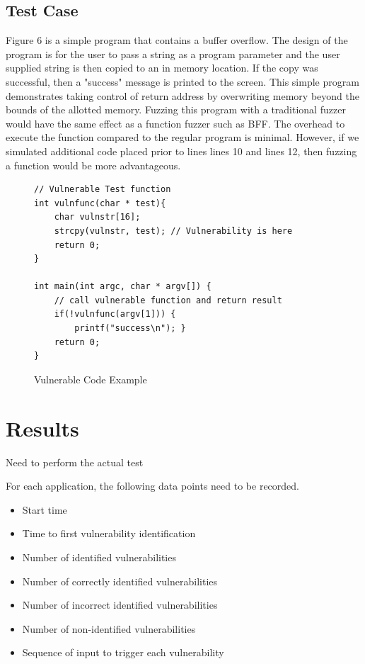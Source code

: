 \documentclass[conference]{IEEEtran}
\begin{document}
\subsection{Test Case}
Figure 6 is a simple program that contains a buffer overflow. The design of the program is for the user to pass a string as a program parameter and the user supplied string is then copied to an in memory location. If the copy was successful, then a "success" message is printed to the screen. This simple program demonstrates taking control of return address by overwriting memory beyond the bounds of the allotted memory. Fuzzing this program with a traditional fuzzer would have the same effect as a function fuzzer such as BFF. The overhead to execute the function compared to the regular program is minimal. However, if we simulated additional code placed prior to lines lines 10 and lines 12, then fuzzing a function would be more advantageous.  

\begin{figure}
\begin{lstlisting}
// Vulnerable Test function
int vulnfunc(char * test){
	char vulnstr[16];
	strcpy(vulnstr, test); // Vulnerability is here
	return 0;
}

int main(int argc, char * argv[]) {
	// call vulnerable function and return result
	if(!vulnfunc(argv[1])) {
	    printf("success\n"); }
	return 0;
}
\end{lstlisting}
\caption{Vulnerable Code Example}
\end{figure}




\section{Results}
Need to perform the actual test

For each application, the following data points need to be recorded.
\begin{itemize}
\item Start time
\item Time to first vulnerability identification
\item Number of identified vulnerabilities
\item Number of correctly identified vulnerabilities
\item Number of incorrect identified vulnerabilities
\item Number of non-identified vulnerabilities
\item Sequence of input to trigger each vulnerability
\end{itemize}
\end{document}
